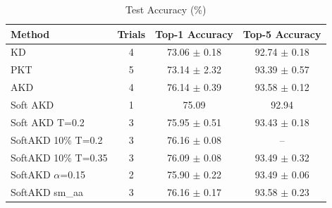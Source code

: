 \documentclass{article} %
\begin{document}
\begin{table}[htbp]
\centering
\caption{Test Accuracy (\%)}
\label{tab:accuracy}
\begin{tabular}{lccc}
\toprule
Method & Trials & Top-1 Accuracy & Top-5 Accuracy \\
\midrule
KD & 4 & 73.06 $\pm$ 0.18 & 92.74 $\pm$ 0.18 \\
PKT & 5 & 73.14 $\pm$ 2.32 & 93.39 $\pm$ 0.57 \\
AKD & 4 & 76.14 $\pm$ 0.39 & 93.58 $\pm$ 0.12 \\
Soft AKD & 1 & 75.09 & 92.94 \\
Soft AKD T=0.2 & 3 & 75.95 $\pm$ 0.51 & 93.43 $\pm$ 0.18 \\
SoftAKD 10\% T=0.2 & 3 & 76.16 $\pm$ 0.08 & -- \\
SoftAKD 10\% T=0.35 & 3 & 76.09 $\pm$ 0.08 & 93.49 $\pm$ 0.32 \\
SoftAKD $\alpha$=0.15 & 2 & 75.90 $\pm$ 0.22 & 93.49 $\pm$ 0.06 \\
SoftAKD sm\_aa & 3 & 76.16 $\pm$ 0.17 & 93.58 $\pm$ 0.23 \\
\bottomrule
\end{tabular}
\end{table}
\end{document}
